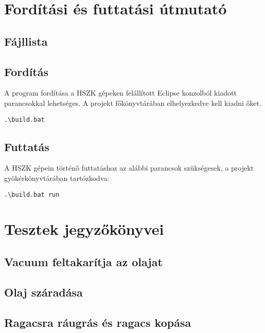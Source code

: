 \section{Fordítási és futtatási útmutató}

\subsection{Fájllista}


\subsection{Fordítás}
A program fordítása a HSZK gépeken felállított Eclipse konzolból kiadott parancsokkal lehetséges.
A projekt főkönyvtárában elhelyezkedve kell kiadni őket.

\lstset{escapeinside=`', xleftmargin=10pt, frame=single, basicstyle=\ttfamily\footnotesize, language=sh}
\begin{lstlisting}
.\build.bat
\end{lstlisting}

\subsection{Futtatás}
A HSZK gépein történő futtatáshoz az alábbi parancsok szükségesek, a projekt gyökérkönyvtárában tartózkodva:

\lstset{escapeinside=`', xleftmargin=10pt, frame=single, basicstyle=\ttfamily\footnotesize, language=sh}
\begin{lstlisting}
.\build.bat run
\end{lstlisting}

\section{Tesztek jegyzőkönyvei}

\subsection{Vacuum feltakarítja az olajat}

\subsection{Olaj száradása}

\subsection{Ragacsra ráugrás és ragacs kopása}

